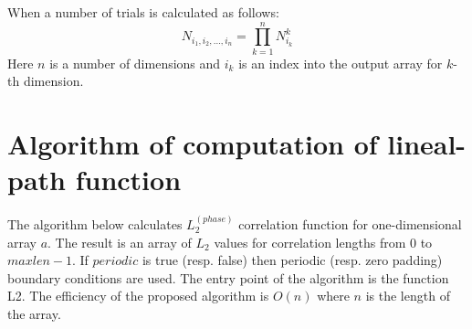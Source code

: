 \documentclass[reprint,amsmath,amssymb,aps,pre,showkeys,showpacs,nofootinbib]{revtex4-1}
\begin{document}
When a number of trials is calculated as follows:
\begin{equation*}
  N_{i_1, i_2, \dots, i_n} = \prod_{k=1}^n N^k_{i_k}
\end{equation*}
Here $n$ is a number of dimensions and $i_k$ is an index into the output array
for $k$-th dimension.

\section{Algorithm of computation of lineal-path function}
\label{linpathalg}
The algorithm below calculates $L_2^{(phase)}$ correlation function for
one-dimensional array $a$. The result is an array of $L_2$ values for
correlation lengths from $0$ to $maxlen-1$. If $periodic$ is true (resp. false)
then periodic (resp. zero padding) boundary conditions are used. The entry point of the
algorithm is the function L2. The efficiency of the proposed algorithm is $O(n)$
where $n$ is the length of the array.


\end{document}
